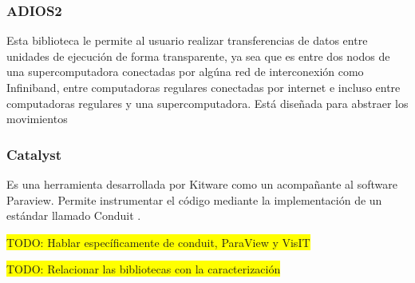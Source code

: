 \subsubsection{ADIOS2}
  Esta biblioteca \cite{Godoy2020} le permite al usuario realizar transferencias de datos entre unidades de ejecución de forma transparente, ya sea que es entre dos nodos de una supercomputadora conectadas por algúna red de interconexión como Infiniband, entre computadoras regulares conectadas por internet e incluso entre computadoras regulares y una supercomputadora.
  Está diseñada para abstraer los movimientos 
\subsubsection{Catalyst}
Es una herramienta desarrollada por Kitware como un acompañante al software Paraview. Permite instrumentar el código mediante la implementación de un estándar llamado Conduit \cite{Ayachit2021}.


\colorbox{yellow}{TODO: Hablar específicamente de conduit, ParaView y VisIT}

\colorbox{yellow}{TODO: Relacionar las bibliotecas con la caracterización}
